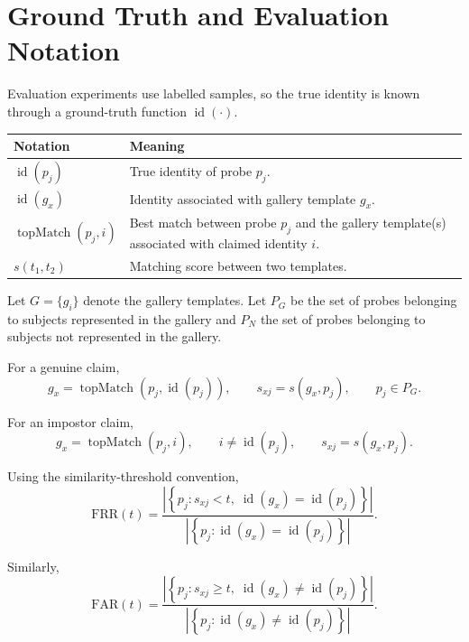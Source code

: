 \documentclass[11pt,a4paper,oneside]{report}
\newcommand{\set}[1]{\left\{ #1 \right\}}
\newcommand{\abs}[1]{\left| #1 \right|}
\newcommand{\id}{\operatorname{id}}
\newcommand{\topMatch}{\operatorname{topMatch}}
\begin{document}
\section{Ground Truth and Evaluation Notation}
\label{subsec:ground-truth}

Evaluation experiments use labelled samples, so the true identity is
known through a ground-truth function
\(
\id(\cdot)
\).

\begin{center}
\begin{tabularx}{\linewidth}{P{3.6cm} X}
\toprule
{}
\textbf{Notation} & \textbf{Meaning} \\
\midrule
\(\id(p_j)\) & True identity of probe \(p_j\). \\
\(\id(g_x)\) & Identity associated with gallery template \(g_x\). \\
\(\topMatch(p_j,i)\) & Best match between probe \(p_j\) and the gallery template(s) associated with claimed identity \(i\). \\
\(s(t_1,t_2)\) & Matching score between two templates. \\
\bottomrule
\end{tabularx}
\end{center}

Let \(G=\{g_i\}\) denote the gallery templates. Let \(P_G\) be the set
of probes belonging to subjects represented in the gallery and \(P_N\) the
set of probes belonging to subjects not represented in the gallery.

For a genuine claim,
\begin{equation}
g_x
=
\topMatch\left(p_j,\id(p_j)\right),
\qquad
s_{xj}
=
s(g_x,p_j),
\qquad
p_j\in P_G.
\label{eq:genuine-topmatch}
\end{equation}

For an impostor claim,
\begin{equation}
g_x
=
\topMatch(p_j,i),
\qquad
i\neq\id(p_j),
\qquad
s_{xj}
=
s(g_x,p_j).
\label{eq:impostor-topmatch}
\end{equation}

Using the similarity-threshold convention,
\begin{equation}
\mathrm{FRR}(t)
=
\frac{
\abs{
\set{
p_j :
s_{xj}< t,
\;
\id(g_x)=\id(p_j)
}
}
}{
\abs{
\set{
p_j :
\id(g_x)=\id(p_j)
}
}
}.
\label{eq:frr}
\end{equation}

Similarly,
\begin{equation}
\mathrm{FAR}(t)
=
\frac{
\abs{
\set{
p_j :
s_{xj}\geq t,
\;
\id(g_x)\neq\id(p_j)
}
}
}{
\abs{
\set{
p_j :
\id(g_x)\neq\id(p_j)
}
}
}.
\label{eq:far}
\end{equation}
\end{document}
